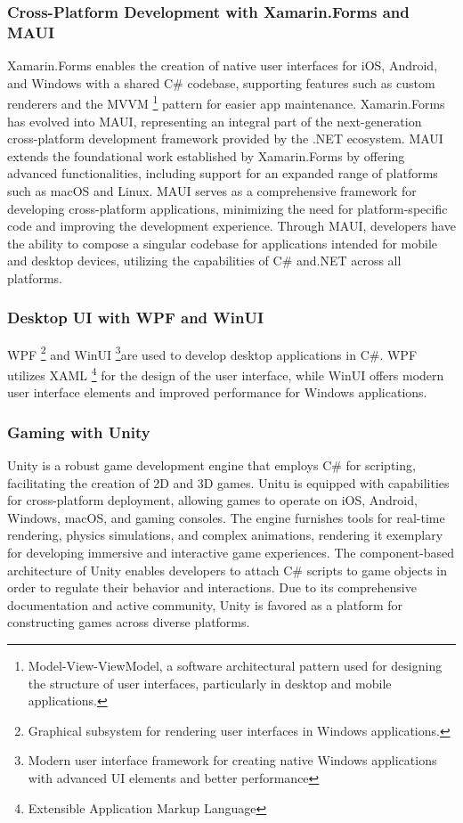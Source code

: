 \subsubsection{Cross-Platform Development with Xamarin.Forms and MAUI}  
Xamarin.Forms enables the creation of native user interfaces for iOS, Android, and Windows with a shared C\# codebase, supporting features such as custom renderers and the MVVM \footnote{Model-View-ViewModel, a software architectural pattern used for designing the structure of user interfaces, particularly in desktop and mobile applications.} pattern for easier app maintenance. 
Xamarin.Forms has evolved into \ac{MAUI}, representing an integral part of the next-generation cross-platform development framework provided by the .NET ecosystem. 
\ac{MAUI} extends the foundational work established by Xamarin.Forms by offering advanced functionalities, including support for an expanded range of platforms such as macOS and Linux. \ac{MAUI} serves as a comprehensive framework for developing cross-platform applications, minimizing the need for platform-specific code and improving the development experience. Through \ac{MAUI}, developers have the ability to compose a singular codebase for applications intended for mobile and desktop devices, utilizing the capabilities of C\# and.NET across all platforms.

\subsubsection{Desktop UI with WPF and WinUI}  
\ac{WPF} \footnote{Graphical subsystem for rendering user interfaces in Windows applications.} and \ac{WinUI} \footnote{Modern user interface framework for creating native Windows applications with advanced UI elements and better performance}are used to develop desktop applications in C\#. \ac{WPF} utilizes XAML \footnote{Extensible Application Markup Language} for the design of the user interface, while \ac{WinUI}  offers modern user interface elements and improved performance for Windows applications.

\subsubsection{Gaming with Unity}

Unity is a robust game development engine that employs C\# for scripting, facilitating the creation of 2D and 3D games. Unitu is equipped with capabilities for cross-platform deployment, allowing games to operate on iOS, Android, Windows, macOS, and gaming consoles. The engine furnishes tools for real-time rendering, physics simulations, and complex animations, rendering it exemplary for developing immersive and interactive game experiences. The component-based architecture of Unity enables developers to attach C\# scripts to game objects in order to regulate their behavior and interactions. Due to its comprehensive documentation and active community, Unity is favored as a platform for constructing games across diverse platforms.

